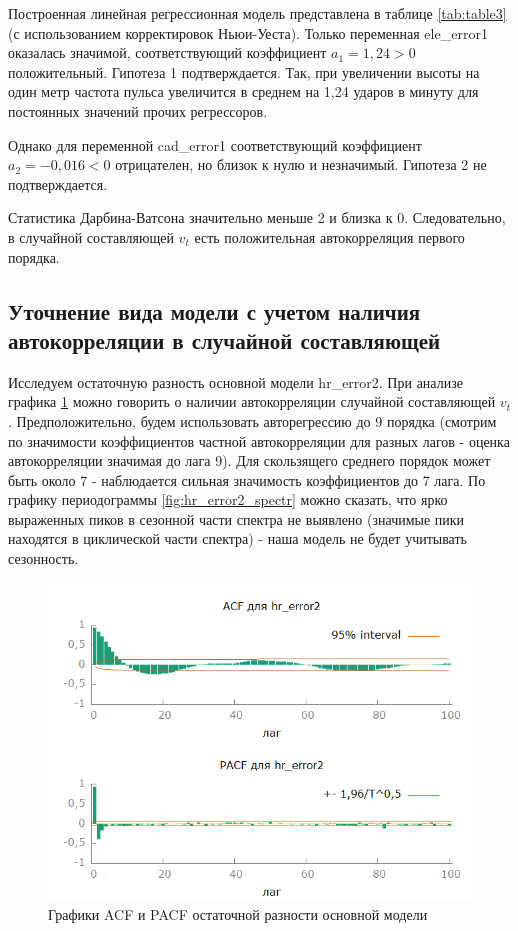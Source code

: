 \documentclass[a4paper,12pt]{article}
\begin{document}
Построенная линейная регрессионная модель представлена в таблице \ref{tab:table3} (с использованием корректировок Ньюи-Уеста). Только переменная ele\_error1 оказалась значимой, соответствующий коэффициент $a_1 = 1,24 > 0$ положительный. Гипотеза 1 подтверждается. Так, при увеличении высоты на один метр частота пульса увеличится в среднем на 1,24 ударов в минуту для постоянных значений прочих регрессоров.

Однако для переменной cad\_error1 соответствующий коэффициент $a_2 = -0,016 < 0$ отрицателен, но близок к нулю и незначимый. Гипотеза 2 не подтверждается.

Статистика Дарбина-Ватсона значительно меньше 2 и близка к 0. Следовательно, в случайной составляющей $v_t$ есть положительная автокорреляция первого порядка.

\subsection{Уточнение вида модели с учетом наличия автокорреляции в случайной составляющей}
Исследуем остаточную разность основной модели hr\_error2. При анализе графика \ref{fig:hr_error2_acf_100} можно говорить о наличии автокорреляции случайной составляющей $v_t$. Предположительно, будем использовать авторегрессию до 9 порядка (смотрим по значимости коэффициентов частной автокорреляции для разных лагов - оценка автокорреляции значимая до лага 9). Для скользящего среднего порядок может быть около 7 - наблюдается сильная значимость коэффициентов до 7 лага. По графику периодограммы \ref{fig:hr_error2_spectr} можно сказать, что ярко выраженных пиков в сезонной части спектра не выявлено (значимые пики находятся в циклической части спектра) - наша модель не будет учитывать сезонность. 

\begin{figure}[H]
	\centering
	\includegraphics[width=0.5\linewidth]{../[graphics]/hr_error2_acf_100.png}
	\caption{Графики ACF и PACF остаточной разности основной модели}
	\label{fig:hr_error2_acf_100}
\end{figure}
\end{document}
